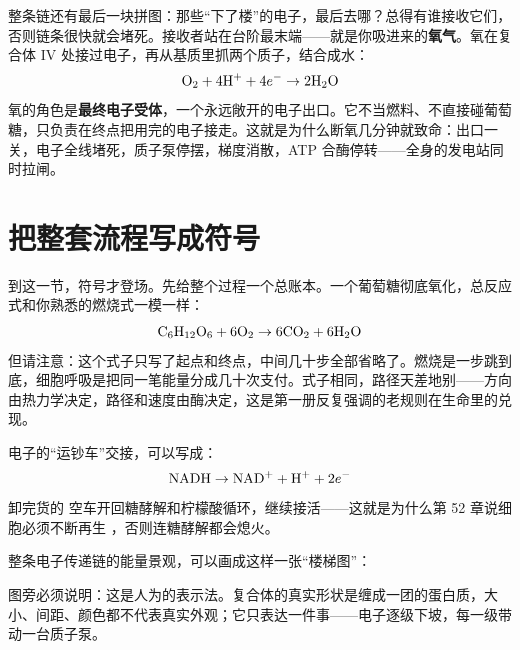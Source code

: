 整条链还有最后一块拼图：那些“下了楼”的电子，最后去哪？总得有谁接收它们，否则链条很快就会堵死。接收者站在台阶最末端——就是你吸进来的\textbf{氧气}。氧在复合体 IV 处接过电子，再从基质里抓两个质子，结合成水：
\[\mathrm{O_2} + 4\mathrm{H^+} + 4e^- \rightarrow 2\mathrm{H_2O}\]
氧的角色是\textbf{最终电子受体}，一个永远敞开的电子出口。它不当燃料、不直接碰葡萄糖，只负责在终点把用完的电子接走。这就是为什么断氧几分钟就致命：出口一关，电子全线堵死，质子泵停摆，梯度消散，ATP 合酶停转——全身的发电站同时拉闸。

\section{把整套流程写成符号}

到这一节，符号才登场。先给整个过程一个总账本。一个葡萄糖彻底氧化，总反应式和你熟悉的燃烧式一模一样：
\[\mathrm{C_6H_{12}O_6} + 6\mathrm{O_2} \rightarrow 6\mathrm{CO_2} + 6\mathrm{H_2O}\]
但请注意：这个式子只写了起点和终点，中间几十步全部省略了。燃烧是一步跳到底，细胞呼吸是把同一笔能量分成几十次支付。式子相同，路径天差地别——方向由热力学决定，路径和速度由酶决定，这是第一册反复强调的老规则在生命里的兑现。

电子的“运钞车”交接，可以写成：
\[\mathrm{NADH} \rightarrow \mathrm{NAD^+} + \mathrm{H^+} + 2e^-\]
卸完货的  空车开回糖酵解和柠檬酸循环，继续接活——这就是为什么第 52 章说细胞必须不断再生 ，否则连糖酵解都会熄火。

整条电子传递链的能量景观，可以画成这样一张“楼梯图”：

\begin{center}
\end{center}

图旁必须说明：这是人为的表示法。复合体的真实形状是缠成一团的蛋白质，大小、间距、颜色都不代表真实外观；它只表达一件事——电子逐级下坡，每一级带动一台质子泵。

